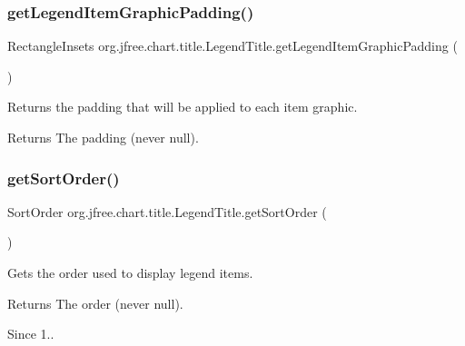\subsubsection{\texorpdfstring{get\+Legend\+Item\+Graphic\+Padding()}{getLegendItemGraphicPadding()}}
{\footnotesize\ttfamily Rectangle\+Insets org.\+jfree.\+chart.\+title.\+Legend\+Title.\+get\+Legend\+Item\+Graphic\+Padding (\begin{DoxyParamCaption}{ }\end{DoxyParamCaption})}

Returns the padding that will be applied to each item graphic.

\begin{DoxyReturn}{Returns}
The padding (never {\ttfamily null}). 
\end{DoxyReturn}
\mbox{\label{classorg_1_1jfree_1_1chart_1_1title_1_1_legend_title_a1b57dc9956b90cdd8d71a742715435fc}} 
\subsubsection{\texorpdfstring{get\+Sort\+Order()}{getSortOrder()}}
{\footnotesize\ttfamily Sort\+Order org.\+jfree.\+chart.\+title.\+Legend\+Title.\+get\+Sort\+Order (\begin{DoxyParamCaption}{ }\end{DoxyParamCaption})}

Gets the order used to display legend items.

\begin{DoxyReturn}{Returns}
The order (never {\ttfamily null}). 
\end{DoxyReturn}
\begin{DoxySince}{Since}
1.. 
\end{DoxySince}
\mbox{\label{classorg_1_1jfree_1_1chart_1_1title_1_1_legend_title_a2703d7646e4fbb23ae3ce2e57b74498c}} 
